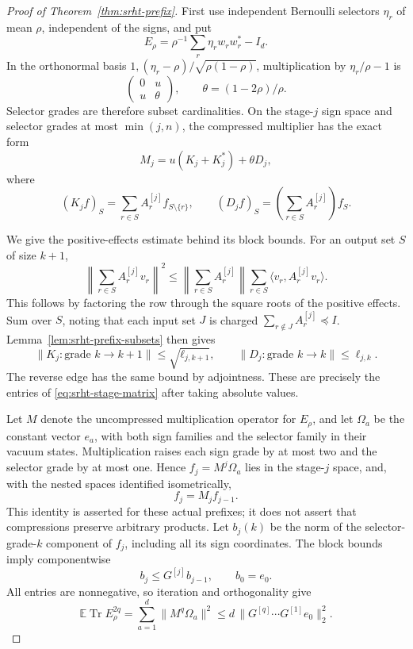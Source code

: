 \documentclass[11pt,a4paper]{article}
\theoremstyle{definition}\newtheorem{definition}[theorem]{Definition}
\theoremstyle{remark}\newtheorem{remark}[theorem]{Remark}
\newcommand{\E}{\mathbb E}\newcommand{\Prob}{\mathbb P}
\newcommand{\Tr}{\operatorname{Tr}}\newcommand{\tr}{\operatorname{Tr}}
\newcommand{\norm}[1]{\lVert#1\rVert}\newcommand{\ip}[2]{\langle#1,#2\rangle}
\numberwithin{equation}{section}
\begin{document}
\begin{proof}[Proof of Theorem~\ref{thm:srht-prefix}]
First use independent Bernoulli selectors $\eta_r$ of mean $\rho$,
independent of the signs, and put
\[
 E_\rho=\rho^{-1}\sum_r\eta_rw_rw_r^*-I_d.
\]
In the orthonormal basis
$1,(\eta_r-\rho)/\sqrt{\rho(1-\rho)}$, multiplication by
$\eta_r/\rho-1$ is
\[
 \begin{pmatrix}0&u\\u&\theta\end{pmatrix},
 \qquad \theta=(1-2\rho)/\rho.
\]
Selector grades are therefore subset cardinalities. On the stage-$j$
sign space and selector grades at most $\min(j,n)$, the compressed
multiplier has the exact form
\[
 M_j=u(K_j+K_j^*)+\theta D_j,
\]
where
\[
 (K_jf)_S=\sum_{r\in S}A_r^{[j]}f_{S\setminus\{r\}},
 \qquad
 (D_jf)_S=\left(\sum_{r\in S}A_r^{[j]}\right)f_S.
\]

We give the positive-effects estimate behind its block bounds. For an
output set $S$ of size $k+1$,
\[
 \left\|\sum_{r\in S}A_r^{[j]}v_r\right\|^2
 \le\left\|\sum_{r\in S}A_r^{[j]}\right\|
       \sum_{r\in S}\langle v_r,A_r^{[j]}v_r\rangle.
\]
This follows by factoring the row through the square roots of the
positive effects. Sum over $S$, noting that each input set $J$ is charged
$\sum_{r\notin J}A_r^{[j]}\preceq I$. Lemma~\ref{lem:srht-prefix-subsets}
then gives
\[
 \norm{K_j:\text{grade }k\to k+1}\le\sqrt{\ell_{j,k+1}},
 \qquad
 \norm{D_j:\text{grade }k\to k}\le\ell_{j,k}.
\]
The reverse edge has the same bound by adjointness. These are precisely
the entries of \eqref{eq:srht-stage-matrix} after taking absolute values.

Let $M$ denote the uncompressed multiplication operator for $E_\rho$,
and let $\Omega_a$ be the constant vector $e_a$, with both sign families
and the selector family in their vacuum states. Multiplication raises
each sign grade by at most two and the selector grade by at most one.
Hence $f_j=M^j\Omega_a$ lies in the stage-$j$ space, and, with the
nested spaces identified isometrically,
\[
 f_j=M_j f_{j-1}.
\]
This identity is asserted for these actual prefixes; it does not assert
that compressions preserve arbitrary products. Let $b_j(k)$ be the norm
of the selector-grade-$k$ component of $f_j$, including all its sign
coordinates. The block bounds imply componentwise
\[
 b_j\le G^{[j]}b_{j-1},\qquad b_0=e_0.
\]
All entries are nonnegative, so iteration and orthogonality give
\begin{equation}
 \E\Tr E_\rho^{2q}
   =\sum_{a=1}^d\norm{M^q\Omega_a}^2
   \le d\,\bigl\|G^{[q]}\cdots G^{[1]}e_0\bigr\|_2^2.
 \label{eq:srht-bernoulli-prefix}
\end{equation}


\end{proof}
\end{document}
